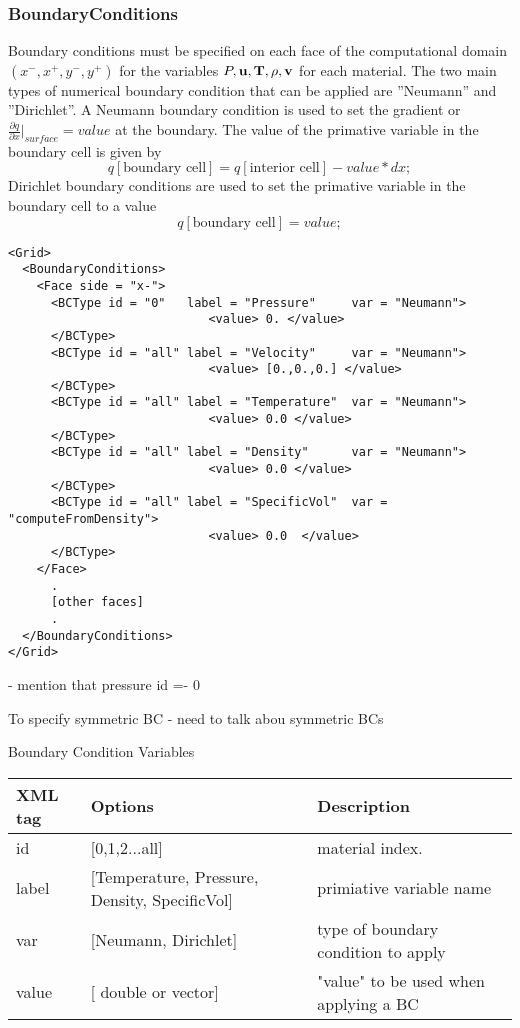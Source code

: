 \subsubsection{BoundaryConditions}
Boundary conditions must be specified on each face of the computational 
domain $(x^-, x^+, y^-, y^+)$ for the variables $P, \bf{u}, T, \rho, v$ for each material.  
The two main types of numerical boundary condition that can be applied are ''Neumann'' and ''Dirichlet''.  A Neumann boundary condition is used to set the gradient or $\frac{\partial{q}}{\partial{x}}|_{surface} = value$ at the boundary.   The value of the primative variable in the boundary cell is given by 
%
\begin{equation}
    q[\text{boundary cell}] = q[\text{interior cell}] - value * dx;
\end{equation}
%
Dirichlet boundary conditions are used to set the primative variable in the
boundary cell to a value
%
\begin{equation}
    q[\text{boundary cell}] =  value;
\end{equation}
%
\footnotesize
\begin{verbatim}
<Grid>
  <BoundaryConditions>
    <Face side = "x-">
      <BCType id = "0"   label = "Pressure"     var = "Neumann">
                            <value> 0. </value>
      </BCType>
      <BCType id = "all" label = "Velocity"     var = "Neumann">
                            <value> [0.,0.,0.] </value>
      </BCType>
      <BCType id = "all" label = "Temperature"  var = "Neumann">
                            <value> 0.0 </value>
      </BCType>
      <BCType id = "all" label = "Density"      var = "Neumann">
                            <value> 0.0 </value>
      </BCType>
      <BCType id = "all" label = "SpecificVol"  var = "computeFromDensity">
                            <value> 0.0  </value>
      </BCType>
    </Face>
      .
      [other faces]
      .
  </BoundaryConditions>
</Grid>
\end{verbatim}

- mention that pressure id =- 0

To specify symmetric BC
- need to talk abou symmetric BCs


\begin{center}
Boundary Condition Variables
\begin{tabular}{l p{7cm} p{7cm}}
\footnotesize{XML tag} & \footnotesize{Options}& \footnotesize{Description}\\
\hline
\hline
id          &  [0,1,2...all]                                   &   material index.\\
label       & [Temperature, Pressure, Density, SpecificVol]    &   primiative variable name\\
var         & [Neumann, Dirichlet]                             &   type of boundary condition to apply \\
value       & [ double or vector]                              &   "value" to be used when applying a BC\\
\hline
\end{tabular}
\end{center}
\normalfont
